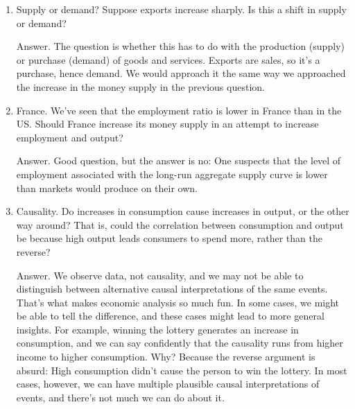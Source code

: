 \begin{enumerate}
\item Supply or demand?
Suppose exports increase sharply.
Is this a shift in supply or demand?

Answer.  The question is whether this has to do with the production (supply)
or purchase (demand) of goods and services.
Exports are sales, so it's a purchase, hence demand.
We would approach it the same way we approached the increase
in the money supply in the previous question.

%

\item France.
We've seen that the employment ratio is lower in France than in the US.
Should France increase its money supply in an attempt to increase
employment and output?

Answer.  Good question, but the answer is no:
One suspects that the level of employment
associated with the long-run aggregate supply
 curve is lower than
markets would produce on their own.

\item Causality.
Do increases in consumption cause increases in output,
or the other way around?
That is, could the correlation between consumption and output be because
high output leads consumers to spend more, rather than the reverse?

Answer.  We observe data, not causality,
and we may not be able to distinguish between
alternative causal interpretations of the same events.
That's what makes economic analysis so much fun.
In some cases, we might be able to tell the difference,
and these cases might lead to more general insights.
For example, winning the lottery generates an increase in consumption,
and we can say confidently that the causality runs from
higher income to higher consumption.
Why?  Because the reverse argument is absurd: High consumption didn't cause the person to win the lottery.
In most cases, however,
we can have multiple plausible causal interpretations of events,
and there's not much we can do about it.
\end{enumerate}
\setlength{\leftmargini}{\oldleftmargini}


